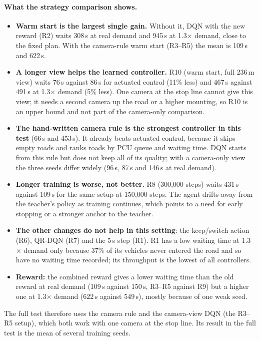 \paragraph{What the strategy comparison shows.}
\begin{itemize}
  \item \textbf{Warm start is the largest single gain.} Without it, DQN with the new reward (R2)
        waits 308\,s at real demand and 945\,s at 1.3$\times$ demand, close to the fixed plan.
        With the camera-rule warm start (R3--R5) the mean is 109\,s and 622\,s.
  \item \textbf{A longer view helps the learned controller.} R10 (warm start, full 236\,m view)
        waits 76\,s against 86\,s for actuated control (11\% less) and 467\,s against 491\,s at
        1.3$\times$ demand (5\% less). One camera at the stop line cannot give this view; it needs
        a second camera up the road or a higher mounting, so R10 is an upper bound and not part of
        the camera-only comparison.
  \item \textbf{The hand-written camera rule is the strongest controller in this test}
        (66\,s and 453\,s). It already beats actuated control, because it skips empty roads and
        ranks roads by PCU queue and waiting time. DQN starts from this rule but does not keep all
        of its quality; with a camera-only view the three seeds differ widely (96\,s, 87\,s and
        146\,s at real demand).
  \item \textbf{Longer training is worse, not better.} R8 (300{,}000 steps) waits 431\,s against
        109\,s for the same setup at 150{,}000 steps. The agent drifts away from the teacher's
        policy as training continues, which points to a need for early stopping or a stronger
        anchor to the teacher.
  \item \textbf{The other changes do not help in this setting}: the keep/switch action (R6),
        QR-DQN (R7) and the 5\,s step (R1). R1 has a low waiting time at 1.3$\times$ demand only
        because 37\% of its vehicles never entered the road and so have no waiting time recorded;
        its throughput is the lowest of all controllers.
  \item \textbf{Reward:} the combined reward gives a lower waiting time than the old reward at real
        demand (109\,s against 150\,s, R3--R5 against R9) but a higher one at 1.3$\times$ demand
        (622\,s against 549\,s), mostly because of one weak seed.
\end{itemize}
The full test therefore uses the camera rule and the camera-view DQN (the R3--R5 setup), which
both work with one camera at the stop line. Its result in the full test is the mean of several training seeds.
